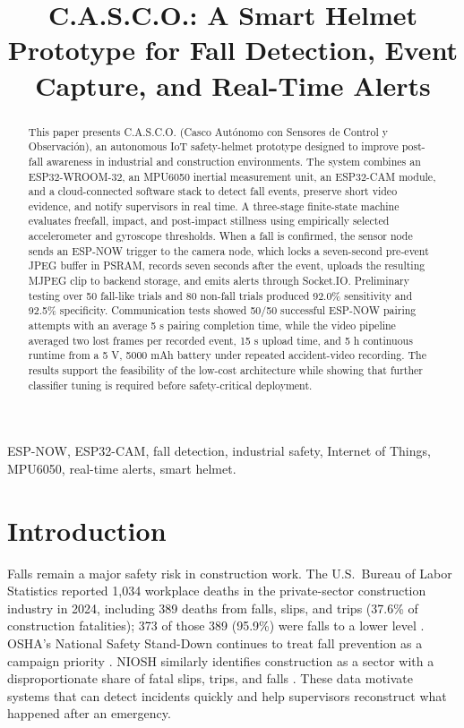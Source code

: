 \documentclass[conference]{IEEEtran}
\title{C.A.S.C.O.: A Smart Helmet Prototype for Fall Detection, Event Capture, and Real-Time Alerts}
\author{%
\IEEEauthorblockN{Josué López, Student Member, IEEE}
\IEEEauthorblockA{\cascoaff\\
josuerlb1110@gmail.com}
\and
\IEEEauthorblockN{Jorge Larios, Student Member, IEEE}
\IEEEauthorblockA{\cascoaff\\
romerojorge0504@gmail.com}
\cascolinebreakand
\IEEEauthorblockN{Francisco Reyes, Student Member, IEEE}
\IEEEauthorblockA{\cascoaff\\
Reeyes888@gmail.com}
\and
\IEEEauthorblockN{Job N. Acosta, Member, IEEE}
\IEEEauthorblockA{\cascoaff\\
jobacosta@ieee.org}%
}
\begin{document}
\maketitle

\begin{abstract}
This paper presents C.A.S.C.O. (Casco Autónomo con Sensores de Control y Observación), an autonomous IoT safety-helmet prototype designed to improve post-fall awareness in industrial and construction environments. The system combines an ESP32-WROOM-32, an MPU6050 inertial measurement unit, an ESP32-CAM module, and a cloud-connected software stack to detect fall events, preserve short video evidence, and notify supervisors in real time. A three-stage finite-state machine evaluates freefall, impact, and post-impact stillness using empirically selected accelerometer and gyroscope thresholds. When a fall is confirmed, the sensor node sends an ESP-NOW trigger to the camera node, which locks a seven-second pre-event JPEG buffer in PSRAM, records seven seconds after the event, uploads the resulting MJPEG clip to backend storage, and emits alerts through Socket.IO. Preliminary testing over 50 fall-like trials and 80 non-fall trials produced 92.0\% sensitivity and 92.5\% specificity. Communication tests showed 50/50 successful ESP-NOW pairing attempts with an average 5 s pairing completion time, while the video pipeline averaged two lost frames per recorded event, 15 s upload time, and 5 h continuous runtime from a 5 V, 5000 mAh battery under repeated accident-video recording. The results support the feasibility of the low-cost architecture while showing that further classifier tuning is required before safety-critical deployment.
\end{abstract}

\begin{IEEEkeywords}
ESP-NOW, ESP32-CAM, fall detection, industrial safety, Internet of Things, MPU6050, real-time alerts, smart helmet.
\end{IEEEkeywords}

\section{Introduction}
Falls remain a major safety risk in construction work. The U.S.\ Bureau of Labor Statistics reported 1{,}034 workplace deaths in the private-sector construction industry in 2024, including 389 deaths from falls, slips, and trips (37.6\% of construction fatalities); 373 of those 389 (95.9\%) were falls to a lower level \cite{bls2026}. OSHA's National Safety Stand-Down continues to treat fall prevention as a campaign priority \cite{osha2026}. NIOSH similarly identifies construction as a sector with a disproportionate share of fatal slips, trips, and falls \cite{niosh2026}. These data motivate systems that can detect incidents quickly and help supervisors reconstruct what happened after an emergency.
\end{document}
